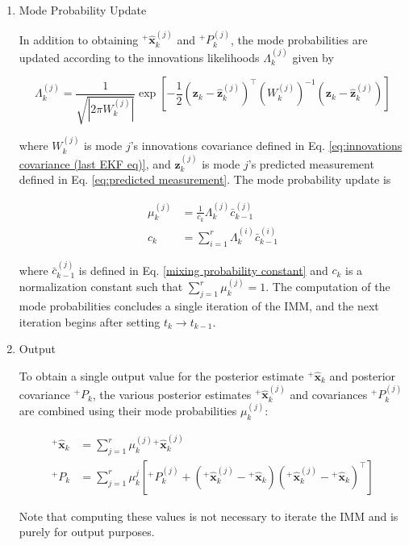 \documentclass[letterpaper, preprint, paper,11pt]{AAS}	%
\begin{document}
\begin{enumerate}
    \item Mode Probability Update

    In addition to obtaining ${}^+\hat{\bm{x}}_k^{(j)}$ and ${}^+P_k^{(j)}$, the mode probabilities are updated according to the innovations likelihoods $\Lambda_k^{(j)}$ given by

    \begin{equation}
        \Lambda_k^{(j)} = \dfrac{1}{\sqrt{|2\pi W_k^{(j)}|}} \exp[-\frac{1}{2} (\bm{z}_k - \bm{\hat{z}}_k^{(j)})^\top (W_k^{(j)})^{-1} (\bm{z}_k - \bm{\hat{z}}_k^{(j)})]
    \end{equation}

    where $W_k^{(j)}$ is mode $j$'s innovations covariance defined in Eq. \ref{eq:innovations covariance (last EKF eq)}, and $\hat{\bm{z}}_k^{(j)}$ is mode $j$'s predicted measurement defined in Eq. \ref{eq:predicted measurement}. The mode probability update is 

    \begin{align}
    \mu_k^{(j)} & = \frac{1}{c_k} \Lambda_k^{(j)} \bar{c}_{k-1}^{(j)} \\
    c_k &= \sum_{i=1}^r \Lambda_k^{(i)} \bar{c}_{k-1}^{(i)} 
    \end{align}

    where $\bar{c}_{k-1}^{(j)}$ is defined in Eq. \ref{mixing probability constant} and $c_k$ is a normalization constant such that $\sum_{j=1}^r \mu_k^{(j)} = 1$. The computation of the mode probabilities concludes a single iteration of the IMM, and the next iteration begins after setting $t_k \rightarrow t_{k-1}$.

    \item Output

    To obtain a single output value for the posterior estimate ${}^+\hat{\bm{x}}_k$ and posterior covariance ${}^+P_k $, the various posterior estimates ${}^+\hat{\bm{x}}_k^{(j)}$ and covariances ${}^+P_k^{(j)}$ are combined using their mode probabilities $\mu_k^{(j)}$:

    \begin{align}
        {}^+\bm{\hat{x}}_k &= \sum_{j=1}^r \mu_k^{(j)} {}^+\bm{\hat{x}}_k^{(j)}  \\
        {}^+P_k &= \sum_{j=1}^r \mu_k^j [{}^+P_k^{(j)} + ({}^+\bm{\hat{x}}_k^{(j)} - {}^+\bm{\hat{x}}_k)({}^+\bm{\hat{x}}_k^{(j)} - {}^+\bm{\hat{x}}_k)^\top]
    \end{align}

    Note that computing these values is not necessary to iterate the IMM and is purely for output purposes.
    
\end{enumerate}
\end{document}
